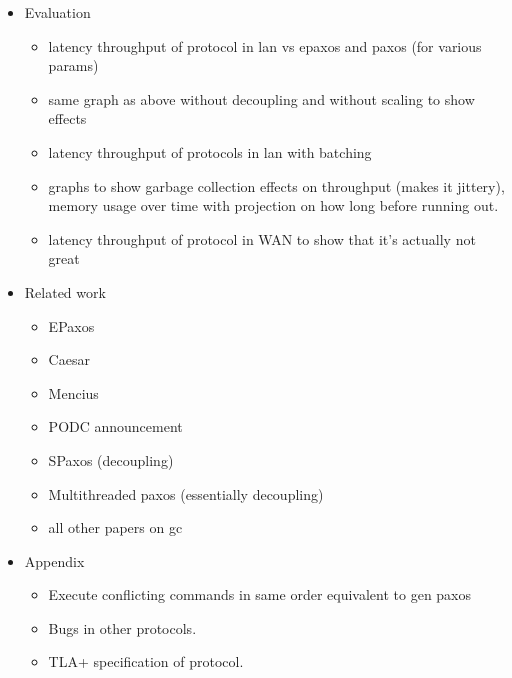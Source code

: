 \begin{itemize}
  \item Evaluation
    \begin{itemize}
      \item
        latency throughput of protocol in lan vs epaxos and paxos (for various
        params)
      \item
        same graph as above without decoupling and without scaling to show
        effects
      \item
        latency throughput of protocols in lan with batching
      \item
        graphs to show garbage collection effects on throughput (makes it
        jittery), memory usage over time with projection on how long before
        running out.
      \item
        latency throughput of protocol in WAN to show that it's actually not
        great
    \end{itemize}

  \item Related work
    \begin{itemize}
      \item EPaxos
      \item Caesar
      \item Mencius
      \item PODC announcement
      \item SPaxos (decoupling)
      \item Multithreaded paxos (essentially decoupling)
      \item all other papers on gc
    \end{itemize}

  \item Appendix
    \begin{itemize}
      \item Execute conflicting commands in same order equivalent to gen paxos
      \item Bugs in other protocols.
      \item TLA+ specification of protocol.
    \end{itemize}
\end{itemize}
